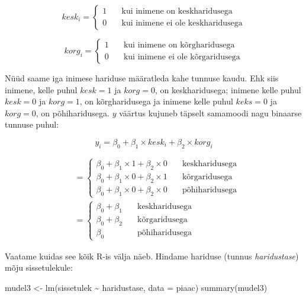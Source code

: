 \documentclass[
]{book}
\newenvironment{Shaded}{\begin{snugshade}}{\end{snugshade}}
\newcommand{\AttributeTok}[1]{\textcolor[rgb]{0.77,0.63,0.00}{#1}}
\newcommand{\FunctionTok}[1]{\textcolor[rgb]{0.00,0.00,0.00}{#1}}
\newcommand{\NormalTok}[1]{#1}
\newcommand{\OtherTok}[1]{\textcolor[rgb]{0.56,0.35,0.01}{#1}}
\newcommand{\SpecialCharTok}[1]{\textcolor[rgb]{0.00,0.00,0.00}{#1}}
\begin{document}
\[ kesk_{i} =
  \begin{cases}
    1  & \quad \text{kui inimene on keskharidusega}\\
    0  & \quad \text{kui inimene ei ole keskharidusega}
  \end{cases}
\]

\[ korg_{i} =
  \begin{cases}
    1  & \quad \text{kui inimene on kõrgharidusega}\\
    0  & \quad \text{kui inimene ei ole kõrgaridusega}
  \end{cases}
\]

Nüüd saame iga inimese hariduse määratleda kahe tunnuse kaudu. Ehk siis inimene, kelle puhul \(kesk = 1\) ja \(korg = 0\), on keskharidusega; inimene kelle puhul \(kesk = 0\) ja \(korg = 1\), on kõrgharidusega ja inimene kelle puhul \(keks = 0\) ja \(korg = 0\), on põhiharidusega. \(y\) väärtus kujuneb täpselt samamoodi nagu binaarse tunnuse puhul:

\[y_i=\beta_0+\beta_1 \times kesk_i+\beta_2 \times korg_i\]

\begin{align}
&=
  \begin{cases}
    \beta_0+\beta_1 \times 1+\beta_2 \times 0  & \quad \text{keskharidusega}\\
    \beta_0+\beta_1 \times 0+\beta_2 \times 1  & \quad \text{kõrgaridusega}\\
    \beta_0+\beta_1 \times 0+\beta_2 \times 0  & \quad \text{põhiharidusega}
  \end{cases}\\
&=
  \begin{cases}
    \beta_0+\beta_1  & \quad \text{keskharidusega}\\
    \beta_0+\beta_2  & \quad \text{kõrgaridusega}\\
    \beta_0  & \quad \text{põhiharidusega}
  \end{cases}
\end{align}

Vaatame kuidas see kõik R-is välja näeb. Hindame hariduse (tunnus \emph{haridustase}) mõju sissetulekule:

\begin{Shaded}
\begin{Highlighting}[]
\NormalTok{mudel3 }\OtherTok{\textless{}{-}} \FunctionTok{lm}\NormalTok{(sissetulek }\SpecialCharTok{\textasciitilde{}}\NormalTok{ haridustase, }\AttributeTok{data =}\NormalTok{ piaac)}
\FunctionTok{summary}\NormalTok{(mudel3)}
\end{Highlighting}
\end{Shaded}
\end{document}
